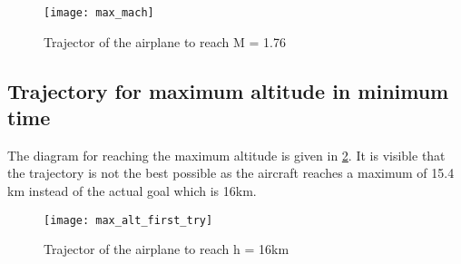 \begin{figure}[H]
    \centering
    \texttt{[image: max\_mach]}
    \caption{Trajector of the airplane to reach M = 1.76}
    \label{fig:max_mach}
\end{figure}

\subsection{Trajectory for maximum altitude in minimum time}
The diagram for reaching the maximum altitude is given in \ref{fig:max_alt_first_try}.
It is visible that the trajectory is not the best possible as the aircraft reaches a maximum of 15.4 km
instead of the actual goal which is 16km.

\begin{figure}[H]
    \hspace*{-1cm}
    \centering
    \texttt{[image: max\_alt\_first\_try]}
    \caption{Trajector of the airplane to reach h = 16km}
    \label{fig:max_alt_first_try}
\end{figure}
